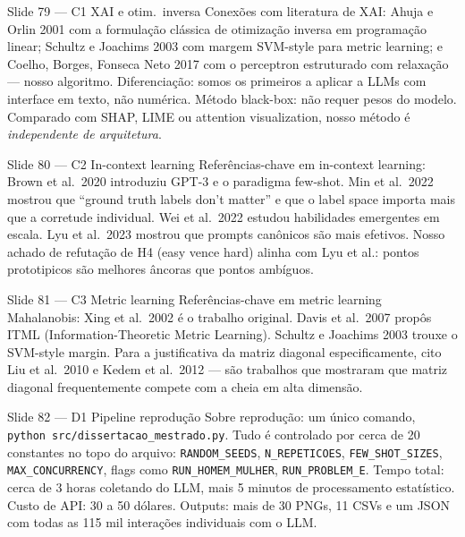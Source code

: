\documentclass[aspectratio=169,10pt]{beamer}
\begin{document}
\begin{frame}{Slide 79 --- C1 XAI e otim.\ inversa}
\footnotesize
Conex\~oes com literatura de XAI: Ahuja e Orlin 2001 com a formula\c{c}\~ao cl\'assica de otimiza\c{c}\~ao inversa em programa\c{c}\~ao linear; Schultz e Joachims 2003 com margem SVM-style para metric learning; e Coelho, Borges, Fonseca Neto 2017 com o perceptron estruturado com relaxa\c{c}\~ao --- nosso algoritmo. Diferencia\c{c}\~ao: somos os primeiros a aplicar a LLMs com interface em texto, n\~ao num\'erica. M\'etodo black-box: n\~ao requer pesos do modelo. Comparado com SHAP, LIME ou attention visualization, nosso m\'etodo \'e \emph{independente de arquitetura}.
\end{frame}

\begin{frame}{Slide 80 --- C2 In-context learning}
\footnotesize
Refer\^encias-chave em in-context learning: Brown et al.\ 2020 introduziu GPT-3 e o paradigma few-shot. Min et al.\ 2022 mostrou que ``ground truth labels don't matter'' e que o label space importa mais que a corretude individual. Wei et al.\ 2022 estudou habilidades emergentes em escala. Lyu et al.\ 2023 mostrou que prompts can\^onicos s\~ao mais efetivos. Nosso achado de refuta\c{c}\~ao de H4 (easy vence hard) alinha com Lyu et al.: pontos prototipicos s\~ao melhores \^ancoras que pontos amb\'iguos.
\end{frame}

\begin{frame}{Slide 81 --- C3 Metric learning}
\footnotesize
Refer\^encias-chave em metric learning Mahalanobis: Xing et al.\ 2002 \'e o trabalho original. Davis et al.\ 2007 prop\^os ITML (Information-Theoretic Metric Learning). Schultz e Joachims 2003 trouxe o SVM-style margin. Para a justificativa da matriz diagonal especificamente, cito Liu et al.\ 2010 e Kedem et al.\ 2012 --- s\~ao trabalhos que mostraram que matriz diagonal frequentemente compete com a cheia em alta dimens\~ao.
\end{frame}

\begin{frame}{Slide 82 --- D1 Pipeline reprodu\c{c}\~ao}
\footnotesize
Sobre reprodu\c{c}\~ao: um \'unico comando, \texttt{python src/dissertacao\_mestrado.py}. Tudo \'e controlado por cerca de 20 constantes no topo do arquivo: \texttt{RANDOM\_SEEDS}, \texttt{N\_REPETICOES}, \texttt{FEW\_SHOT\_SIZES}, \texttt{MAX\_CONCURRENCY}, flags como \texttt{RUN\_HOMEM\_MULHER}, \texttt{RUN\_PROBLEM\_E}. Tempo total: cerca de 3 horas coletando do LLM, mais 5 minutos de processamento estat\'istico. Custo de API: 30 a 50 d\'olares. Outputs: mais de 30 PNGs, 11 CSVs e um JSON com todas as 115 mil intera\c{c}\~oes individuais com o LLM.
\end{frame}
\end{document}
